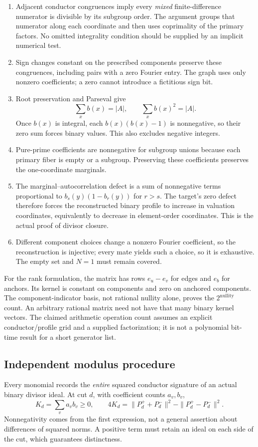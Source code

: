 \documentclass[10pt]{article}
\begin{document}
\begin{enumerate}
\item Adjacent conductor congruences imply every \emph{mixed}
finite-difference numerator is divisible by its subgroup order. The
argument groups that numerator along each coordinate and then uses
coprimality of the primary factors. No omitted integrality condition
should be supplied by an implicit numerical test.
\item Sign changes constant on the prescribed components preserve these
congruences, including pairs with a zero Fourier entry. The graph uses
only nonzero coefficients; a zero cannot introduce a fictitious sign bit.
\item Root preservation and Parseval give
\[
 \sum_x b(x)=|A|,\qquad \sum_x b(x)^2=|A|.
\]
Once $b(x)$ is integral, each $b(x)(b(x)-1)$ is nonnegative, so their
zero sum forces binary values. This also excludes negative integers.
\item Pure-prime coefficients are nonnegative for subgroup unions because
each primary fiber is empty or a subgroup. Preserving these coefficients
preserves the one-coordinate marginals.
\item The marginal--autocorrelation defect is a sum of nonnegative terms
proportional to $b_s(y)(1-b_r(y))$ for $r>s$. The target's zero defect
therefore forces the reconstructed binary profile to increase in
valuation coordinates, equivalently to decrease in element-order
coordinates. This is the actual proof of divisor closure.
\item Different component choices change a nonzero Fourier coefficient,
so the reconstruction is injective; every mate yields such a choice,
so it is exhaustive. The empty set and $N=1$ must remain covered.
\end{enumerate}

For the rank formulation, the matrix has rows $e_u-e_v$ for edges and
$e_b$ for anchors. Its kernel is constant on components and zero on
anchored components. The component-indicator basis, not rational nullity
alone, proves the $2^{\text{nullity}}$ count. An arbitrary rational matrix
need not have that many binary kernel vectors. The claimed arithmetic
operation count assumes an explicit conductor/profile grid and a supplied
factorization; it is not a polynomial bit-time result for a short
generator list.

\subsection{Independent modulus procedure}
Every monomial records the \emph{entire} squared conductor signature of an
actual binary divisor ideal. At cut $d$, with coefficient counts $a_v,b_v$,
\[
 K_d=\sum_v a_vb_v\ge0,
 \qquad 4K_d=\|P_d^++P_d^-\|^2-\|P_d^+-P_d^-\|^2.
\]
Nonnegativity comes from the first expression, not a general assertion
about differences of squared norms. A positive term must retain an ideal
on each side of the cut, which guarantees distinctness.
\end{document}
